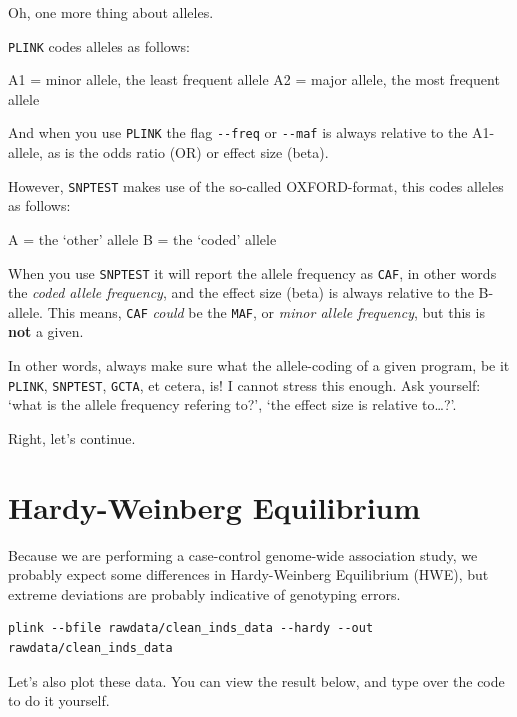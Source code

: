 \documentclass[
]{book}
\begin{document}
Oh, one more thing about alleles.

\texttt{PLINK} codes alleles as follows:

A1 = minor allele, the least frequent allele
A2 = major allele, the most frequent allele

And when you use \texttt{PLINK} the flag \texttt{-\/-freq} or \texttt{-\/-maf} is always relative to the A1-allele, as is the odds ratio (OR) or effect size (beta).

However, \texttt{SNPTEST} makes use of the so-called OXFORD-format, this codes alleles as follows:

A = the `other' allele
B = the `coded' allele

When you use \texttt{SNPTEST} it will report the allele frequency as \texttt{CAF}, in other words the \emph{coded allele frequency}, and the effect size (beta) is always relative to the B-allele. This means, \texttt{CAF} \emph{could} be the \texttt{MAF}, or \emph{minor allele frequency}, but this is \textbf{not} a given.

In other words, always make sure what the allele-coding of a given program, be it \texttt{PLINK}, \texttt{SNPTEST}, \texttt{GCTA}, et cetera, is! I cannot stress this enough. Ask yourself: `what is the allele frequency refering to?', `the effect size is relative to\ldots?'.

Right, let's continue.

\hypertarget{hardy-weinberg-equilibrium}{%
\section{Hardy-Weinberg Equilibrium}\label{hardy-weinberg-equilibrium}}

Because we are performing a case-control genome-wide association study, we probably expect some differences in Hardy-Weinberg Equilibrium (HWE), but extreme deviations are probably indicative of genotyping errors.

\begin{verbatim}
plink --bfile rawdata/clean_inds_data --hardy --out rawdata/clean_inds_data
\end{verbatim}

Let's also plot these data. You can view the result below, and type over the code to do it yourself.
\end{document}
